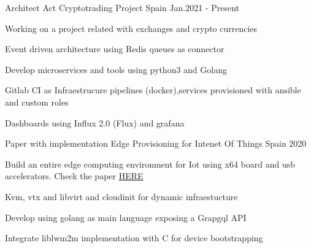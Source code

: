 

\begin{cventries}

  \cventry
    {Architect} %
    {Act Cryptotrading Project} %
    {Spain} %
    {Jan.2021 - Present} %
    {
      \begin{cvitems} %
        \item {Working on a project related with exchanges and crypto currencies}
        \item {Event driven architecture using Redis queues as connector}
        \item {Develop microservices and tools using python3 and Golang}
        \item {Gitlab CI as Infraestrucure pipelines (docker),services provisioned with ansible and custom roles}
        \item {Dashboards using Influx 2.0 (Flux) and grafana}
      \end{cvitems}
    }

  \cventry
    {Paper with implementation} %
    {Edge Provisioning for Intenet Of Things} %
    {Spain} %
    {2020} %
    {
      \begin{cvitems} %
        \item {Build an entire edge computing environment for Iot using x64 board and usb accelerators. Check the paper \href{https://eprints.ucm.es/id/eprint/62175/}{HERE}}
        \item {Kvm, vtx and libvirt and cloudinit for dynamic infraestucture}
        \item {Develop using golang as main language exposing a Grapgql API}
        \item {Integrate liblwm2m implementation with C for device bootstrapping}
      \end{cvitems}
    }


\end{cventries}
